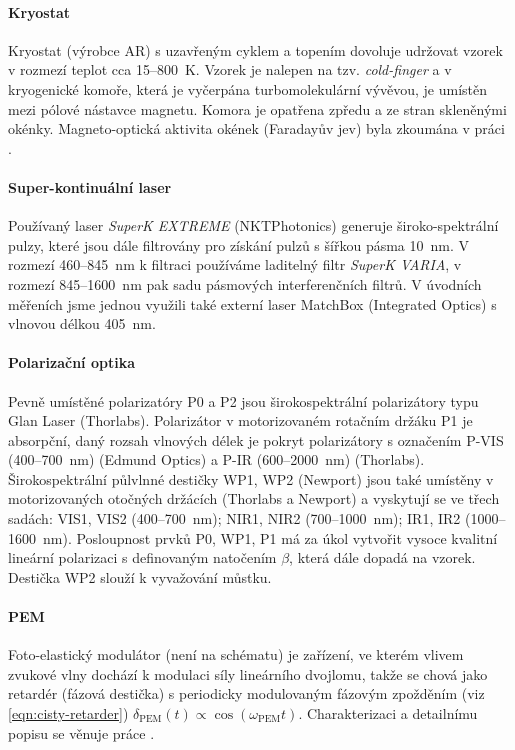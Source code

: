 \paragraph{Kryostat}
Kryostat (výrobce AR) s uzavřeným cyklem a topením dovoluje udržovat vzorek v rozmezí teplot cca 15--\SI{800}{\kelvin}.
Vzorek je nalepen na tzv. \emph{cold-finger} a v kryogenické komoře, která je vyčerpána turbomolekulární vývěvou, je umístěn mezi pólové nástavce magnetu.
Komora je opatřena zpředu a ze stran skleněnými okénky.
Magneto-optická aktivita okének (Faradayův jev) byla zkoumána v práci \cite{baduraMagnetooptickaMereniPro2019}.

\paragraph{Super-kontinuální laser}
Používaný laser \emph{SuperK EXTREME} (NKT\linebreak Pho\-to\-nics) generuje široko-spektrální pulzy, které jsou dále filtrovány pro získání pulzů s šířkou pásma \SI{10}{\nano\meter}.
V rozmezí \num{460}--\SI{845}{\nano\meter} k filtraci používáme laditelný filtr \emph{SuperK VARIA}, v rozmezí \num{845}--\SI{1600}{\nano\meter} pak sadu pásmových interferenčních filtrů.
V úvodních měřeních jsme jednou využili také externí laser MatchBox (Integrated Optics) s vlnovou délkou \SI{405}{\nano\meter}.

\paragraph{Polarizační optika}
Pevně umístěné polarizatóry P0 a P2 jsou širokospektrální polarizátory typu Glan Laser (Thorlabs).
Polarizátor v motorizovaném rotačním držáku P1 je absorpční, daný rozsah vlnových délek je pokryt polarizátory s označením P-VIS (\num{400}--\SI{700}{\nano\meter}) (Edmund Optics) a P-IR (\num{600}--\SI{2000}{\nano\meter}) (Thorlabs).
Širokospektrální půlvlnné destičky WP1, WP2 (Newport) jsou také umístěny v motorizovaných otočných držácích (Thorlabs a Newport) a vyskytují se ve třech sadách: VIS1, VIS2 (\num{400}--\SI{700}{\nano\meter}); NIR1, NIR2 (\num{700}--\SI{1000}{\nano\meter}); IR1, IR2 (\num{1000}--\SI{1600}{\nano\meter}).
Posloupnost prvků P0, WP1, P1 má za úkol vytvořit vysoce kvalitní lineární polarizaci s definovaným natočením $\beta$, která dále dopadá na vzorek.
Destička WP2 slouží k vyvažování můstku.

\paragraph{PEM}
Foto-elastický modulátor (není na schématu) je zařízení, ve kterém vlivem zvukové vlny dochází k modulaci síly lineárního dvojlomu,
takže se chová jako retardér (fázová destička) s periodicky modulovaným fázovým zpožděním (viz \eqref{eqn:cisty-retarder}) $\delta_\textrm{PEM}(t) \propto \cos(\omega_\textrm{PEM}t)$. 
Charakterizaci a detailnímu popisu se věnuje práce \cite{minarModulacePolarizaceSvetelne2004}.

